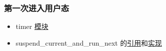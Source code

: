 \begin{frame}
    \frametitle{第一次进入用户态}
% 
\begin{itemize}
    \item timer \href{https://gitee.com/rcore-os/rCore-Tutorial-v3/blob/ch3/os/src/timer.rs\#L12}{模块}
    \item suspend\_current\_and\_run\_next 的\href{https://gitee.com/rcore-os/rCore-Tutorial-v3/blob/ch3/os/src/trap/mod.rs\#L53}{引用}和\href{https://gitee.com/rcore-os/rCore-Tutorial-v3/blob/ch3/os/src/task/mod.rs\#L119}{实现}    
\end{itemize}
\end{frame}

